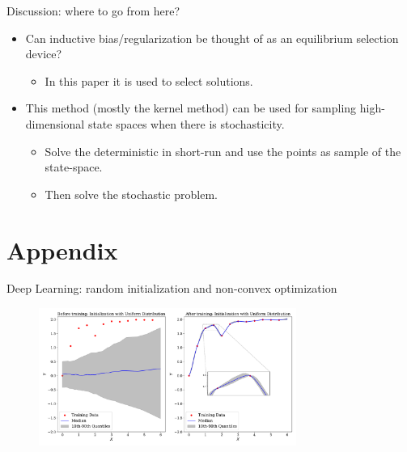 \documentclass[aspectratio=169,10pt]{beamer}
\begin{document}
\begin{frame}{Discussion: where to go from here?}
	\begin{itemize}
		\item Can inductive bias/regularization be thought of as an equilibrium selection device?
		\begin{itemize}
			\item In this paper it is used to select solutions.
		\end{itemize}
		\smallskip
		\item This method (mostly the kernel method) can be used for sampling high-dimensional state spaces when there is stochasticity. 
		\begin{itemize}
		\item Solve the deterministic in short-run and use the points as sample of the state-space.
		\smallskip
		\item Then solve the stochastic problem.
		\end{itemize}
	\end{itemize}
\end{frame}

\section{Appendix}

\begin{frame}{Deep Learning: random initialization and non-convex optimization  }
\label{dif_dist}
	
	\begin{figure}[t!]
		\centering
		\includegraphics[width=0.75\textwidth]{figs/smooth_interpolation_100_seeds_uniform_init.pdf}
	\end{figure}
	\hyperlink{non_convex}{}
\end{frame}
\end{document}
